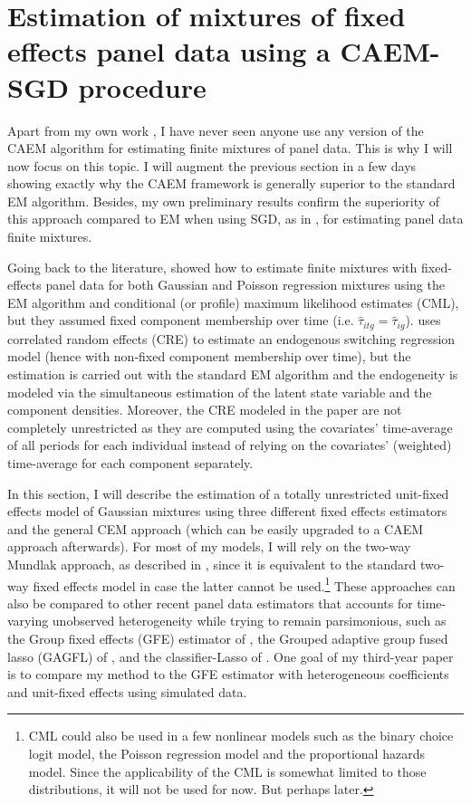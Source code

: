 \documentclass[11pt,letter]{article}
\begin{document}
\section{Estimation of mixtures of fixed effects panel data using a CAEM-SGD procedure}
Apart from my own work \citep{langevin_estimating_2021}, I have never seen anyone use any version of the CAEM algorithm for estimating finite mixtures of panel data. This is why I will now focus on this topic. I will augment the previous section in a few days showing exactly why the CAEM framework is generally superior to the standard EM algorithm. Besides, my own preliminary results confirm the superiority of this approach compared to EM when using SGD, as in \cite{gepperth_gradient-based_2021}, for estimating panel data finite mixtures.
\par
Going back to the literature, \cite{deb_finite_2013} showed how to estimate finite mixtures with fixed-effects panel data for both Gaussian and Poisson regression mixtures using the EM algorithm and conditional (or profile) maximum likelihood estimates (CML), but they assumed fixed component membership over time (i.e. $\hat{\tau}_{itg} = \hat{\tau}_{ig}$). \cite{hyppolite_alternative_2017} uses correlated random effects (CRE) to estimate an endogenous switching regression model (hence with non-fixed component membership over time), but the estimation is carried out with the standard EM algorithm and the endogeneity is modeled via the simultaneous estimation of the latent state variable and the component densities. Moreover, the CRE modeled in the paper are not completely unrestricted as they are computed using the covariates' time-average of all periods for each individual instead of relying on the covariates' (weighted) time-average for each component separately.
\par
In this section, I will describe the estimation of a totally unrestricted unit-fixed effects model of Gaussian mixtures using three different fixed effects estimators and the general CEM approach (which can be easily upgraded to a CAEM approach afterwards). For most of my models, I will rely on the two-way Mundlak approach, as described in \cite{wooldridge_two-way_2021}, since it is equivalent to the standard two-way fixed effects model in case the latter cannot be used.\footnote{CML could also be used in a few nonlinear models such as the binary choice logit model, the Poisson regression model and the proportional hazards model. Since the applicability of the CML is somewhat limited to those distributions, it will not be used for now. But perhaps later.} These approaches can also be compared to other recent panel data estimators that accounts for time-varying unobserved heterogeneity while trying to remain parsimonious, such as the Group fixed effects (GFE) estimator of \cite{bonhomme_grouped_2015}, the Grouped adaptive group fused lasso (GAGFL) of \cite{okui_heterogeneous_2021}, and the classifier-Lasso of \cite{su_identifying_2016}. One goal of my third-year paper is to compare my method to the GFE estimator with heterogeneous coefficients and unit-fixed effects using simulated data.
\end{document}
